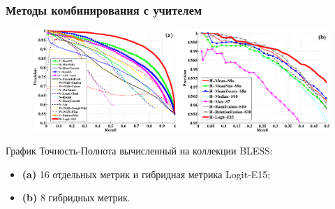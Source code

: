 \documentclass{beamer}
\begin{document}
\begin{frame}
\frametitle{Методы комбинирования с учителем}
\begin{figure}
\centering
\includegraphics[width=1.0\textwidth]{figures/pr}

\end{figure}

График Точность-Полнота вычисленный на коллекции BLESS:
\begin{itemize}
  \item \textbf{(a)} 16 отдельных метрик и гибридная метрика Logit-E15;
  \item \textbf{(b)} 8 гибридных метрик.
\end{itemize}

\end{frame}
\end{document}
